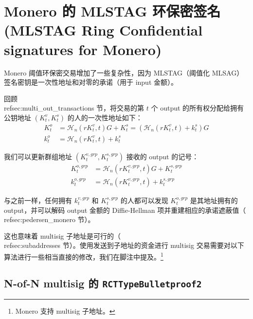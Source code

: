 \section{Monero 的 MLSTAG 环保密签名 (MLSTAG Ring Confidential signatures for Monero)}
\label{sec:MLSTAG-RingCT}

Monero 阈值环保密交易增加了一些复杂性，因为 MLSTAG（阈值化 MLSAG）签名密钥是一次性地址和对零的承诺（用于 input 金额）。

回顾 \\ref{sec:multi_out_transactions} 节，将交易的第 $t$ 个 output 的所有权分配给拥有公钥地址 $(K^v_t,K^s_t)$ 的人的一次性地址如下：\vspace{.175cm}
\begin{align*}
  K_t^o &= \mathcal{H}_n(r K_t^v, t)G + K_t^s = (\mathcal{H}_n(r K_t^v, t) + k_t^s)G  \\ 
  k_t^o &= \mathcal{H}_n(r K_t^v, t) + k_t^s
\end{align*} 

我们可以更新群组地址 $(K^{v,grp}_t,K^{s,grp}_t)$ 接收的 output 的记号：\vspace{.175cm}
\begin{align*}
  K^{o,grp}_t &= \mathcal{H}_n(r K^{v,grp}_t, t)G + K^{s,grp}_t  \\ 
  k^{o,grp}_t &= \mathcal{H}_n(r K^{v,grp}_t, t) + k^{s,grp}_t
\end{align*}

与之前一样，任何拥有 $k^{v,grp}_t$ 和 $K^{s,grp}_t$ 的人都可以发现 $K^{o,grp}_t$ 是其地址拥有的 output，并可以解码 output 金额的 Diffie-Hellman 项并重建相应的承诺遮蔽值（\\ref{sec:pedersen_monero} 节）。

这也意味着 multisig 子地址是可行的（\\ref{sec:subaddresses} 节）。使用发送到子地址的资金进行 multisig 交易需要对以下算法进行一些相当直接的修改，我们在脚注中提及。\footnote{Monero 支持 multisig 子地址。}


\subsection{N-of-N multisig 的 {\tt RCTTypeBulletproof2}}
\label{sec:rcttypebulletproof2-multisig}


